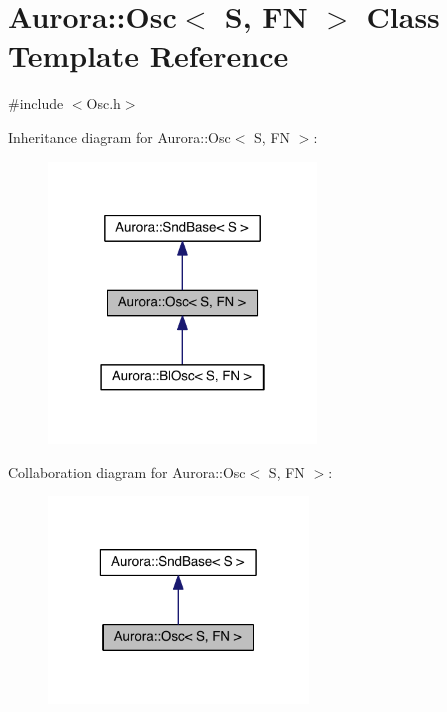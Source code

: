 \hypertarget{class_aurora_1_1_osc}{}\section{Aurora\+:\+:Osc$<$ S, FN $>$ Class Template Reference}
\label{class_aurora_1_1_osc}


{\ttfamily \#include $<$Osc.\+h$>$}



Inheritance diagram for Aurora\+:\+:Osc$<$ S, FN $>$\+:
\nopagebreak
\begin{figure}[H]
\begin{center}
\leavevmode
\includegraphics[width=202pt]{class_aurora_1_1_osc__inherit__graph}
\end{center}
\end{figure}


Collaboration diagram for Aurora\+:\+:Osc$<$ S, FN $>$\+:
\nopagebreak
\begin{figure}[H]
\begin{center}
\leavevmode
\includegraphics[width=196pt]{class_aurora_1_1_osc__coll__graph}
\end{center}
\end{figure}
